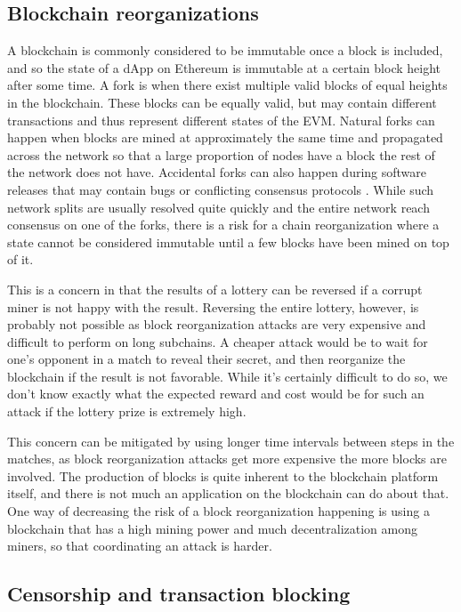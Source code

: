\subsection{Blockchain reorganizations}

A blockchain is commonly considered to be immutable once a block is included, and so the state of a dApp on Ethereum is immutable at a certain block height after some time. A fork is when there exist multiple valid blocks of equal heights in the blockchain. These blocks can be equally valid, but may contain different transactions and thus represent different states of the EVM. Natural forks can happen when blocks are mined at approximately the same time and propagated across the network so that a large proportion of nodes have a block the rest of the network does not have. Accidental forks can also happen during software releases that may contain bugs or conflicting consensus protocols \cite{andresen_march_2013}. While such network splits are usually resolved quite quickly and the entire network reach consensus on one of the forks, there is a risk for a chain reorganization where a state cannot be considered immutable until a few blocks have been mined on top of it.

This is a concern in that the results of a lottery can be reversed if a corrupt miner is not happy with the result. Reversing the entire lottery, however, is probably not possible as block reorganization attacks are very expensive and difficult to perform on long subchains. A cheaper attack would be to wait for one's opponent in a match to reveal their secret, and then reorganize the blockchain if the result is not favorable. While it's certainly difficult to do so, we don't know exactly what the expected reward and cost would be for such an attack if the lottery prize is extremely high.

This concern can be mitigated by using longer time intervals between steps in the matches, as block reorganization attacks get more expensive the more blocks are involved. The production of blocks is quite inherent to the blockchain platform itself, and there is not much an application on the blockchain can do about that. One way of decreasing the risk of a block reorganization happening is using a blockchain that has a high mining power and much decentralization among miners, so that coordinating an attack is harder.

\subsection{Censorship and transaction blocking}

